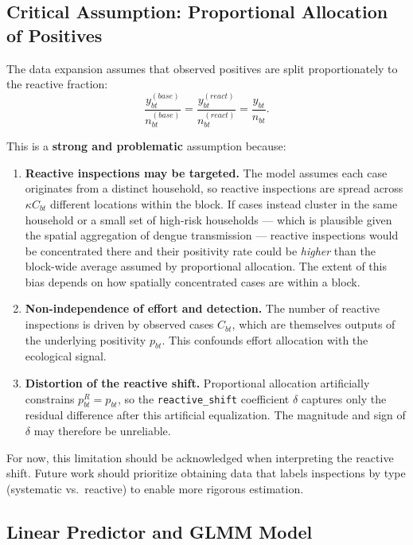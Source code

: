 \documentclass[12pt,a4paper]{article}
\begin{document}
\subsection{Critical Assumption: Proportional Allocation of Positives}

The data expansion assumes that observed positives are split proportionately to the reactive fraction:
\begin{equation}
\frac{y_{bt}^{(base)}}{n_{bt}^{(base)}} = \frac{y_{bt}^{(react)}}{n_{bt}^{(react)}} = \frac{y_{bt}}{n_{bt}}.
\end{equation}

This is a \textbf{strong and problematic} assumption because:

\begin{enumerate}
\item \textbf{Reactive inspections may be targeted.} The model assumes each case originates from a distinct household, so reactive inspections are spread across $\kappa C_{bt}$ different locations within the block. If cases instead cluster in the same household or a small set of high-risk households --- which is plausible given the spatial aggregation of dengue transmission --- reactive inspections would be concentrated there and their positivity rate could be \textit{higher} than the block-wide average assumed by proportional allocation. The extent of this bias depends on how spatially concentrated cases are within a block.

\item \textbf{Non-independence of effort and detection.} The number of reactive inspections is driven by observed cases $C_{bt}$, which are themselves outputs of the underlying positivity $p_{bt}$. This confounds effort allocation with the ecological signal.

\item \textbf{Distortion of the reactive shift.} Proportional allocation artificially constrains $p_{bt}^R = p_{bt}$, so the \texttt{reactive\_shift} coefficient $\delta$ captures only the residual difference after this artificial equalization. The magnitude and sign of $\delta$ may therefore be unreliable.
\end{enumerate}

For now, this limitation should be acknowledged when interpreting the reactive shift. Future work should prioritize obtaining data that labels inspections by type (systematic vs.\ reactive) to enable more rigorous estimation.

\subsection{Linear Predictor and GLMM Model}
\end{document}

